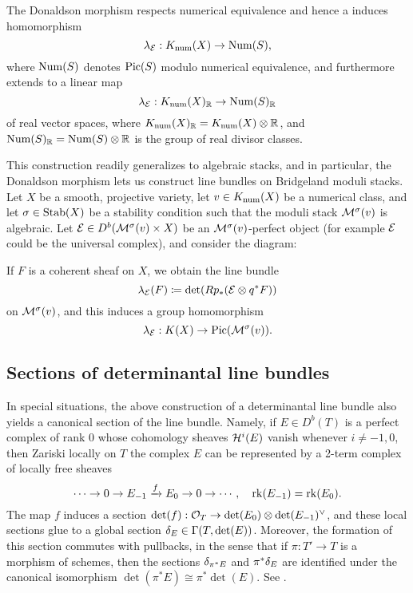 \documentclass[letterpaper,12pt]{amsart}
\theoremstyle{remark}
\begin{document}
The Donaldson morphism respects numerical equivalence and hence a induces homomorphism
\[ \lambda_{\mathcal{E}}: K_{\mathrm{num}}(X) \to \mathrm{Num}(S), \]
where $\mathrm{Num}(S)$ denotes $\mathrm{Pic}(S)$ modulo numerical equivalence, and furthermore extends to a linear map
\[ \lambda_{\mathcal{E}}: K_{\mathrm{num}}(X)_{\mathbb{R}} \to \mathrm{Num}(S)_{\mathbb{R}} \]
of real vector spaces, where $K_{\mathrm{num}}(X)_{\mathbb{R}} = K_{\mathrm{num}}(X) \otimes \mathbb{R}$, and $\mathrm{Num}(S)_{\mathbb{R}} = \mathrm{Num}(S) \otimes \mathbb{R}$ is the group of real divisor classes.

This construction readily generalizes to algebraic stacks, and in particular, the Donaldson morphism lets us construct line bundles on Bridgeland moduli stacks. Let $X$ be a smooth, projective variety, let $v \in K_{\mathrm{num}}(X)$ be a numerical class, and let $\sigma \in \operatorname{\mathrm{Stab}}(X)$ be a stability condition such that the moduli stack $\mathcal{M}^\sigma(v)$ is algebraic. Let $\mathcal{E} \in D^b(\mathcal{M}^\sigma(v) \times X)$ be an $\mathcal{M}^\sigma(v)$-perfect object (for example $\mathcal{E}$ could be the universal complex), and consider the diagram:
\begin{center}
\end{center}
If $F$ is a coherent sheaf on $X$, we obtain the line bundle
\[ \lambda_{\mathcal{E}}(F) \coloneqq \det(R p_*(\mathcal{E} \otimes q^*F)) \]
on $\mathcal{M}^\sigma(v)$, and this induces a group homomorphism
\[ \lambda_{\mathcal{E}}: K(X) \to \mathrm{Pic}(\mathcal{M}^\sigma(v)). \]


\subsection{Sections of determinantal line bundles}
In special situations, the above construction of a determinantal line bundle also yields a canonical section of the line bundle. Namely, if $E \in D^b(T)$ is a perfect complex of rank 0 whose cohomology sheaves $\mathcal{H}^i(E)$ vanish whenever $i \neq -1,0$, then Zariski locally on $T$ the complex $E$ can be represented by a 2-term complex of locally free sheaves
\[ \cdots \to 0 \to E_{-1} \xrightarrow{f} E_0 \to 0 \to \cdots, \quad \operatorname{\mathrm{rk}}(E_{-1}) = \operatorname{\mathrm{rk}}(E_0). \]
The map $f$ induces a section $\det(f): \mathcal{O}_T \to \det(E_0) \otimes \det(E_{-1})^\vee$, and these local sections glue to a global section $\delta_E \in \Gamma(T, \det(E))$. Moreover, the formation of this section commutes with pullbacks, in the sense that if $\pi: T' \to T$ is a morphism of schemes, then the sections $\delta_{\pi^*E}$ and $\pi^*\delta_E$ are identified under the canonical isomorphism $\det(\pi^* E) \cong \pi^*\det(E)$. See \cite[\href{https://stacks.math.columbia.edu/tag/0FJX}{Tag 0FJX}]{stacks-project}.
\end{document}
